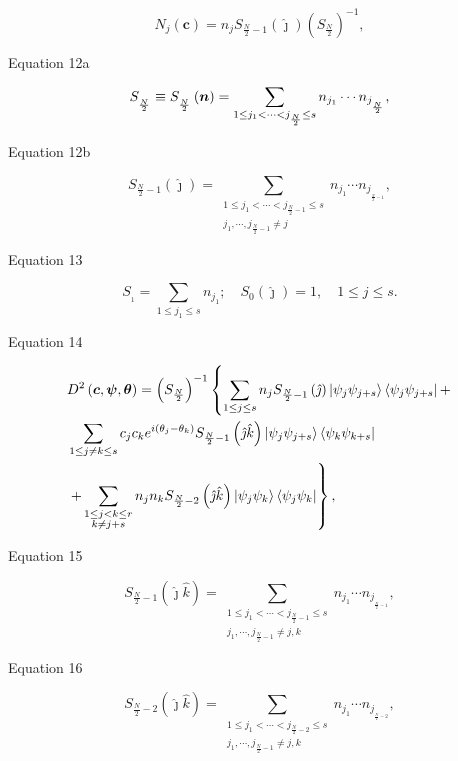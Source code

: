 \documentclass{article}
\begin{document}
\[
N_{j}\left( \boldsymbol{c}\right) =n_{j}S_{\frac{N}{2}-1}\left( \hat{\jmath}%
\right) \left( S_{\frac{N}{2}}\right) ^{-1},
\]

Equation 12a

\[
S_{_{\frac{N}{2}}}\equiv S_{_{\frac{N}{2}}}\left( \boldsymbol{n}\right)
=\sum_{1\leq j_{1}<\cdots <j_{\frac{N}{2}}\leq s}n_{j_{1}}\cdots n_{j_{_{%
\frac{N}{2}}}},
\]

Equation 12b

\[
S_{\frac{N}{2}-1}\left( \hat{\jmath}\right) =\sum_{\substack{ 1\leq
j_{1}<\cdots <j_{\frac{N}{2}-1}\leq s \\ j_{1},\cdots ,j_{\frac{N}{2}-1}\neq
j}}n_{j_{1}}\cdots n_{j_{_{\frac{N}{2}-1}}},
\]

Equation 13

\[
S_{_{1}}=\sum_{1\leq j_{1}\leq s}n_{j_{1}};\quad S_{0}\left( \hat{\jmath}%
\right) =1,\quad 1\leq j\leq s.
\]

Equation 14

\begin{align*}
& D^{2}\left( \boldsymbol{c},\boldsymbol{\psi },\boldsymbol{\theta }\right)
=\left( S_{\frac{N}{2}}\right) ^{-1}\left\{ \sum_{1\leq j\leq s}n_{j}S_{%
\frac{N}{2}-1}\left( \hat{\jmath}\right) \left\vert \psi _{j}\psi
_{j+s}\right\rangle \left\langle \psi _{j}\psi _{j+s}\right\vert +\right.  \\
& \sum_{1\leq j\neq k\leq s}c_{j}c_{k}e^{i\left( \theta _{j}-\theta
_{k}\right) }S_{\frac{N}{2}-1}\left( \hat{\jmath}\hat{k}\right) \left\vert
\psi _{j}\psi _{j+s}\right\rangle \left\langle \psi _{k}\psi
_{k+s}\right\vert  \\
& \left. +\sum_{\substack{ 1\leq j<k\leq r \\ k\neq j+s}}n_{j}n_{k}S_{\frac{N%
}{2}-2}\left( \hat{\jmath}\hat{k}\right) \left\vert \psi _{j}\psi
_{k}\right\rangle \left\langle \psi _{j}\psi _{k}\right\vert \right\} ,
\end{align*}

Equation 15

\[
S_{\frac{N}{2}-1}\left( \hat{\jmath}\hat{k}\right) =\sum_{\substack{ 1\leq
j_{1}<\cdots <j_{\frac{N}{2}-1}\leq s \\ j_{1},\cdots ,j_{\frac{N}{2}-1}\neq
j,k}}n_{j_{1}}\cdots n_{j_{_{\frac{N}{2}-1}}},
\]

Equation 16

\[
S_{\frac{N}{2}-2}\left( \hat{\jmath}\hat{k}\right) =\sum_{\substack{ 1\leq
j_{1}<\cdots <j_{\frac{N}{2}-2}\leq s \\ j_{1},\cdots ,j_{\frac{N}{2}-1}\neq
j,k}}n_{j_{1}}\cdots n_{j_{_{\frac{N}{2}-2}}},
\]
\end{document}
